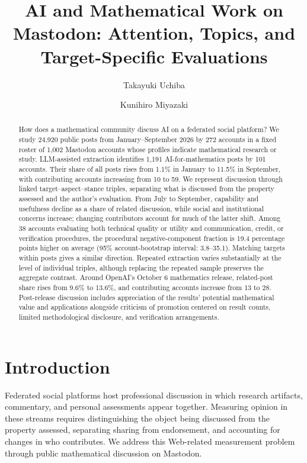 \documentclass[sigconf,balance=false]{acmart}
\title{AI and Mathematical Work on Mastodon: Attention, Topics, and Target-Specific Evaluations}
\author{Takayuki Uchiba}
\affiliation{
  \institution{Sugakubunka Co., Ltd.}
  \city{Tokyo}
  \country{Japan}
}
\affiliation{
  \institution{ZEN Mathematics Center}
  \country{Japan}
}
\author{Kunihiro Miyazaki}
\affiliation{
  \institution{The University of Tokyo}
  \city{Tokyo}
  \country{Japan}
}
\begin{document}
\begin{abstract}
How does a mathematical community discuss AI on a federated social platform? We study 24,920 public posts from January--September 2026 by 272 accounts in a fixed roster of 1,002 Mastodon accounts whose profiles indicate mathematical research or study. LLM-assisted extraction identifies 1,191 AI-for-mathematics posts by 101 accounts. Their share of all posts rises from 1.1\% in January to 11.5\% in September, with contributing accounts increasing from 10 to 59. We represent discussion through linked target--aspect--stance triples, separating what is discussed from the property assessed and the author's evaluation. From July to September, capability and usefulness decline as a share of related discussion, while social and institutional concerns increase; changing contributors account for much of the latter shift. Among 38 accounts evaluating both technical quality or utility and communication, credit, or verification procedures, the procedural negative-component fraction is 19.4 percentage points higher on average (95\% account-bootstrap interval: 3.8--35.1). Matching targets within posts gives a similar direction. Repeated extraction varies substantially at the level of individual triples, although replacing the repeated sample preserves the aggregate contrast. Around OpenAI's October 6 mathematics release, related-post share rises from 9.6\% to 13.6\%, and contributing accounts increase from 13 to 28. Post-release discussion includes appreciation of the results' potential mathematical value and applications alongside criticism of promotion centered on result counts, limited methodological disclosure, and verification arrangements.
\end{abstract}
\maketitle

\section{Introduction}
Federated social platforms host professional discussion in which research artifacts, commentary, and personal assessments appear together. Measuring opinion in these streams requires distinguishing the object being discussed from the property assessed, separating sharing from endorsement, and accounting for changes in who contributes. We address this Web-related measurement problem through public mathematical discussion on Mastodon.
\end{document}
